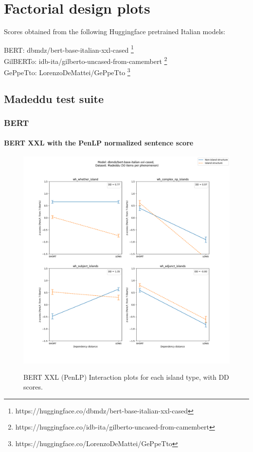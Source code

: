 \chapter{Factorial design plots}

Scores obtained from the following Huggingface pretrained Italian models:

BERT: dbmdz/bert-base-italian-xxl-cased \footnote{https://huggingface.co/dbmdz/bert-base-italian-xxl-cased} \\
GilBERTo: idb-ita/gilberto-uncased-from-camembert \footnote{https://huggingface.co/idb-ita/gilberto-uncased-from-camembert} \\
GePpeTto: LorenzoDeMattei/GePpeTto \citep{de2020geppetto} \footnote{https://huggingface.co/LorenzoDeMattei/GePpeTto} \\

\clearpage
\section{Madeddu test suite}

\subsection{BERT}
\subsubsection{BERT XXL with the PenLP normalized sentence score}
\begin{figure}[h]
	\centering
	\includegraphics[width=1\textwidth]{images/AppendixA/Madeddu_wh_dbmdz_bert-base-italian-xxl-cased_PenLP-zscores-likert-2022-09-14_h15m34s07.png} 
	\label{A-fig:md_bert_penlp}
	\caption{BERT XXL (PenLP) Interaction plots for each island type, with DD scores.}
\end{figure}

